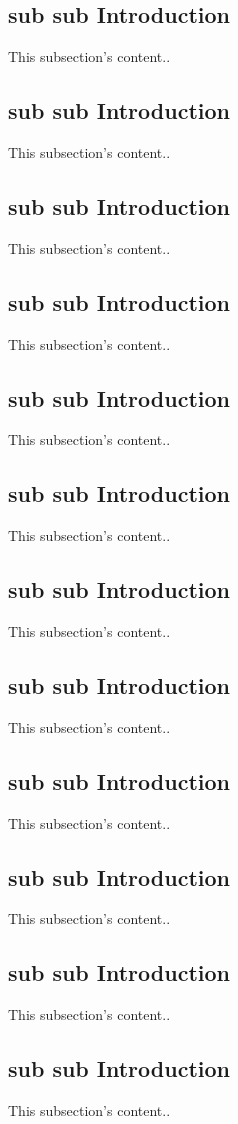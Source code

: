 \documentclass[12pt,a4paper,english]{book}
\begin{document}
\subsection{sub sub Introduction}
This subsection's content..


\subsection{sub sub Introduction}
This subsection's content..
\subsection{sub sub Introduction}
This subsection's content..
\subsection{sub sub Introduction}
This subsection's content..
\subsection{sub sub Introduction}
This subsection's content..
\subsection{sub sub Introduction}
This subsection's content..
\subsection{sub sub Introduction}
This subsection's content..
\subsection{sub sub Introduction}
This subsection's content..
\subsection{sub sub Introduction}
This subsection's content..
\subsection{sub sub Introduction}
This subsection's content..
\subsection{sub sub Introduction}
This subsection's content..
\subsection{sub sub Introduction}
This subsection's content..
\end{document}
